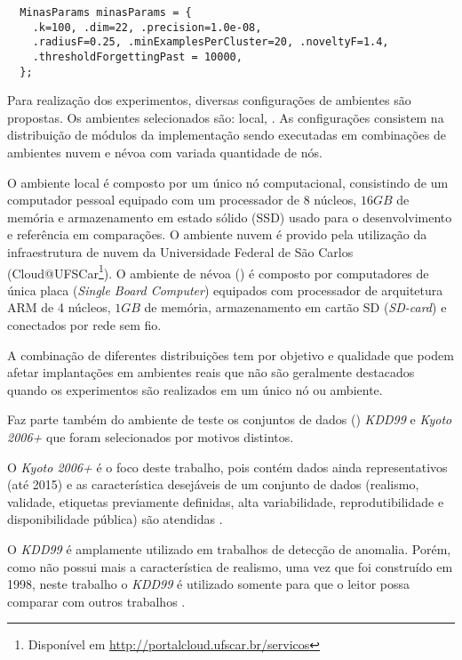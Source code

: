 
\begin{lstlisting}
  MinasParams minasParams = {
    .k=100, .dim=22, .precision=1.0e-08,
    .radiusF=0.25, .minExamplesPerCluster=20, .noveltyF=1.4,
    .thresholdForgettingPast = 10000,
  };
\end{lstlisting}

Para realização dos experimentos, diversas configurações de ambientes são
propostas.
Os ambientes selecionados são: local, 
.
As configurações consistem na distribuição de módulos da implementação \mfog
sendo executadas em combinações de ambientes nuvem e névoa com variada
quantidade de nós.

O ambiente local é composto por um único nó computacional, consistindo de um
computador pessoal equipado com um processador de 8 núcleos, $16GB$ de memória e
armazenamento em estado sólido (SSD) usado para o desenvolvimento e referência
em comparações.
O ambiente nuvem é provido pela utilização da infraestrutura de nuvem da
Universidade Federal de São Carlos (Cloud{@}UFSCar\footnote{Disponível em
\url{http://portalcloud.ufscar.br/servicos}}).
O ambiente de névoa (\fog) é composto por computadores de única placa
(\emph{Single Board Computer}) equipados com processador de arquitetura ARM de 4
núcleos, $1GB$ de memória, armazenamento em cartão SD (\emph{SD-card}) e
conectados por rede sem fio.

A combinação de diferentes distribuições tem por objetivo  e qualidade que podem afetar implantações em ambientes reais que não
são geralmente destacados quando os experimentos são realizados em um único
nó ou ambiente.

Faz parte também do ambiente de teste os conjuntos de dados (\datasets)
\emph{KDD99}
e \emph{Kyoto 2006+}
que foram selecionados por motivos distintos.

O \dataset \emph{Kyoto 2006+} é o foco deste trabalho, pois contém dados ainda
representativos (até 2015) e as característica desejáveis de um conjunto de
dados (realismo, validade, etiquetas previamente definidas, alta variabilidade,
reprodutibilidade e disponibilidade pública) são atendidas
\cite{KyotoDataset,Song2011kyoto}.

O \dataset \emph{KDD99} é amplamente utilizado em trabalhos de detecção de
anomalia.
Porém, como não possui mais a característica de realismo, uma vez que foi
construído em 1998, neste trabalho o \dataset \emph{KDD99} é utilizado somente
para que o leitor possa comparar com outros trabalhos
\cite{Tavallaee2009,Protic2018KddKyoto}.

